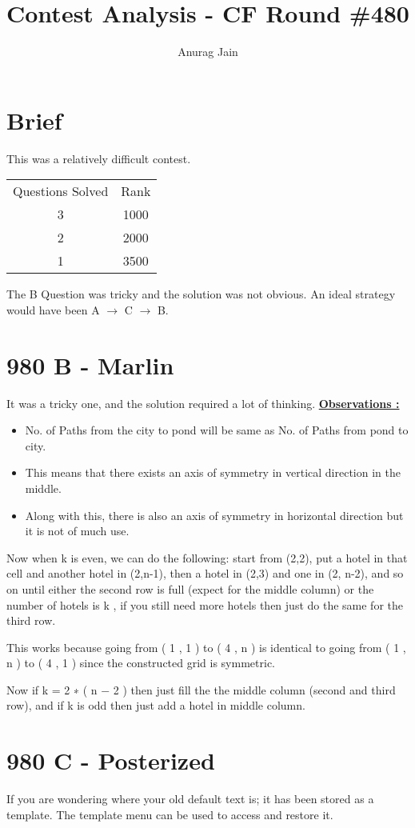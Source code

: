 \documentclass[11pt]{article}
\title{\textbf{Contest Analysis - CF Round \#480}}
\author{Anurag Jain}
\date{}
\begin{document}
\maketitle

\section{Brief}

This was a relatively difficult contest.

\begin{tabular}{|cc|}
\hline
	Questions Solved &  Rank\\
	3 & 1000\\
	2 & 2000\\
	1 & 3500\\
\hline
\end{tabular}

The B Question was tricky and the solution was not obvious.
An ideal strategy would have been A $\rightarrow$ C $\rightarrow$ B.

\section{980 B - Marlin}
It was a tricky one, and the solution required a lot of thinking.
\underline{\textbf{Observations :}}
    \begin{itemize}
      \item No. of Paths from the city to pond will be same as No. of Paths from pond to city.
      \item This means that there exists an axis of symmetry in vertical direction in the middle.
      \item Along with this, there is also an axis of symmetry in horizontal direction but it is not of much use.
    \end{itemize}
  
Now when 
k
 is even, we can do the following: start from (2,2), put a hotel in that cell and another hotel in (2,n-1), then a hotel in (2,3) and one in (2, n-2), and so on until either the second row is full (expect for the middle column) or the number of hotels is 
k
, if you still need more hotels then just do the same for the third row.

This works because going from 
(
1
,
1
)
 to 
(
4
,
n
)
 is identical to going from 
(
1
,
n
)
 to 
(
4
,
1
)
 since the constructed grid is symmetric.

Now if 
k
=
2
∗
(
n
−
2
)
 then just fill the the middle column (second and third row), and if 
k
 is odd then just add a hotel in middle column.

\section{980 C - Posterized}
If you are wondering where your old default text is; it has been stored as a template. The template menu can be used to access and restore it. 
\end{document}
